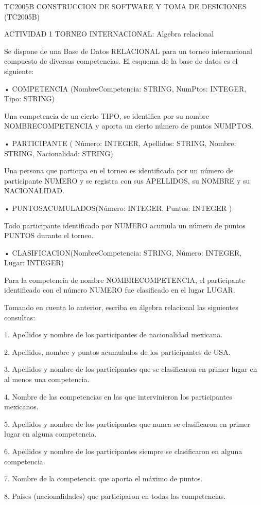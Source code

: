 TC2005B CONSTRUCCION DE SOFTWARE Y TOMA DE DESICIONES (TC2005B) 
 
ACTIVIDAD 1 
TORNEO INTERNACIONAL: Algebra relacional  
 
 
Se dispone de una Base de Datos RELACIONAL para un torneo internacional compuesto de diversas 
competencias. El esquema de la base de datos es el siguiente:  
 
• COMPETENCIA (NombreCompetencia: STRING, NumPtos: INTEGER, Tipo: STRING) 
 
Una competencia de un cierto TIPO, se identifica por su nombre NOMBRECOMPETENCIA y aporta un cierto 
número de puntos NUMPTOS. 
 
• PARTICIPANTE (  Número: INTEGER, 
 Apellidos: STRING, Nombre: STRING, Nacionalidad: STRING) 
 
Una persona que participa en el torneo es identificada por un número de participante NUMERO y se registra con sus 
APELLIDOS, su NOMBRE y su NACIONALIDAD.  
 
• PUNTOSACUMULADOS(Número: INTEGER, Puntos: INTEGER ) 
 
Todo participante identificado por NUMERO acumula un número de puntos PUNTOS durante el torneo.  
 
• CLASIFICACION(NombreCompetencia: STRING, Número: INTEGER, Lugar: INTEGER) 
 
Para la competencia de nombre NOMBRECOMPETENCIA, el participante identificado con el número NUMERO fue 
clasificado en el lugar LUGAR.  
 
 
Tomando en cuenta lo anterior, escriba en álgebra relacional las siguientes consultas: 
 
1. Apellidos y nombre de los participantes de nacionalidad mexicana.  
 
2. Apellidos, nombre y puntos acumulados de los participantes de USA. 
 
3. Apellidos y nombre de los participantes que se clasificaron en primer lugar en al menos una 
competencia. 
 
4. Nombre de las competencias en las que intervinieron los participantes mexicanos. 
 
5. Apellidos y nombre de los participantes que nunca se clasificaron en primer lugar en alguna 
competencia.  
 
6. Apellidos y nombre de los participantes siempre se clasificaron en alguna competencia. 
 
7. Nombre de la competencia que aporta el máximo de puntos. 
 
8. Países (nacionalidades) que participaron en todas las competencias. 
 